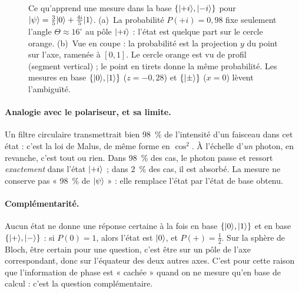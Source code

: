 \begin{figure}[htbp]
\caption{Ce qu'apprend une mesure dans la base $\{\lvert +i\rangle,\lvert -i\rangle\}$ pour $\lvert \psi\rangle=\tfrac35\lvert 0\rangle+\tfrac{4i}5\lvert 1\rangle$. (a)~La probabilité $P(+i)=0{,}98$ fixe seulement l'angle $\Theta\approx16^\circ$ au pôle $\lvert +i\rangle$ : l'état est quelque part sur le cercle orange. (b)~Vue en coupe : la probabilité est la projection $y$ du point sur l'axe, ramenée à $[0,1]$. Le cercle orange est vu de profil (segment vertical) ; le point en tirets donne la même probabilité. Les mesures en base $\{\lvert 0\rangle,\lvert 1\rangle\}$ ($z=-0{,}28$) et $\{\lvert \pm\rangle\}$ ($x=0$) lèvent l'ambiguïté.}\label{fig:cercle-mesure}
\end{figure}

\paragraph{Analogie avec le polariseur, et sa limite.} Un filtre circulaire transmettrait bien 98~\% de l'intensité d'un faisceau dans cet état : c'est la loi de Malus, de même forme en $\cos^2$. À l'échelle d'\emph{un} photon, en revanche, c'est tout ou rien. Dans 98~\% des cas, le photon passe et ressort \emph{exactement} dans l'état $\lvert +i\rangle$ ; dans 2~\% des cas, il est absorbé. La mesure ne conserve pas « 98~\% de $\lvert \psi\rangle$ » : elle remplace l'état par l'état de base obtenu.

\paragraph{Complémentarité.} Aucun état ne donne une réponse certaine à la fois en base $\{\lvert 0\rangle,\lvert 1\rangle\}$ et en base $\{\lvert +\rangle,\lvert -\rangle\}$ : si $P(0)=1$, alors l'état est $\lvert 0\rangle$, et $P(+)=\tfrac12$. Sur la sphère de Bloch, être certain pour une question, c'est être sur un pôle de l'axe correspondant, donc sur l'équateur des deux autres axes. C'est pour cette raison que l'information de phase est « cachée » quand on ne mesure qu'en base de calcul : c'est la question complémentaire.

